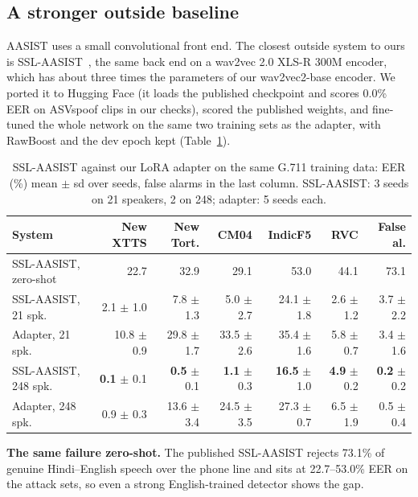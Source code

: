 \subsection{A stronger outside baseline}
\label{sec:res-sslaasist}

AASIST uses a small convolutional front end. The closest outside system to ours is
SSL-AASIST~\cite{tak2022wav2vec}, the same back end on a wav2vec 2.0 XLS-R 300M encoder,
which has about three times the parameters of our wav2vec2-base encoder. We ported it to
Hugging Face (it loads the published checkpoint and scores 0.0\% EER on ASVspoof clips in
our checks), scored the published weights, and fine-tuned the whole network on the same two
training sets as the adapter, with RawBoost and the dev epoch kept (Table~\ref{tab:sslaasist}).

\begin{table}[t]
\centering
\caption{SSL-AASIST against our LoRA adapter on the same G.711 training data: EER (\%)
mean $\pm$ sd over seeds, false alarms in the last column. SSL-AASIST: 3 seeds on 21
speakers, 2 on 248; adapter: 5 seeds each.}
\label{tab:sslaasist}
\footnotesize
\setlength{\tabcolsep}{3pt}
\begin{tabular}{@{}lrrrrrr@{}}
\toprule
System & New XTTS & New Tort. & CM04 & IndicF5 & RVC & False al. \\
\midrule
SSL-AASIST, zero-shot & 22.7 & 32.9 & 29.1 & 53.0 & 44.1 & 73.1 \\
\midrule
SSL-AASIST, 21 spk. & 2.1 $\pm$ 1.0 & 7.8 $\pm$ 1.3 & 5.0 $\pm$ 2.7 & 24.1 $\pm$ 1.8 & 2.6 $\pm$ 1.2 & 3.7 $\pm$ 2.2 \\
Adapter, 21 spk. & 10.8 $\pm$ 0.9 & 29.8 $\pm$ 1.7 & 33.5 $\pm$ 2.6 & 35.4 $\pm$ 1.6 & 5.8 $\pm$ 0.7 & 3.4 $\pm$ 1.6 \\
\midrule
SSL-AASIST, 248 spk. & \textbf{0.1} $\pm$ 0.1 & \textbf{0.5} $\pm$ 0.1 & \textbf{1.1} $\pm$ 0.3 & \textbf{16.5} $\pm$ 1.0 & \textbf{4.9} $\pm$ 0.2 & \textbf{0.2} $\pm$ 0.2 \\
Adapter, 248 spk. & 0.9 $\pm$ 0.3 & 13.6 $\pm$ 3.4 & 24.5 $\pm$ 3.5 & 27.3 $\pm$ 0.7 & 6.5 $\pm$ 1.9 & 0.5 $\pm$ 0.4 \\
\bottomrule
\end{tabular}
\end{table}

\textbf{The same failure zero-shot.} The published SSL-AASIST rejects 73.1\% of genuine
Hindi--English speech over the phone line and sits at 22.7--53.0\% EER on the attack sets,
so even a strong English-trained detector shows the gap.

